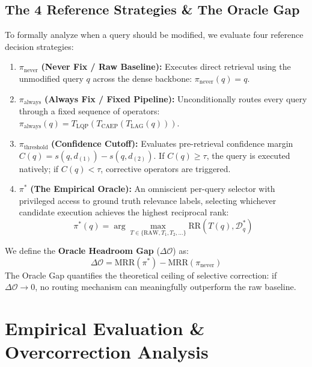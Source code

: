 \documentclass[conference]{IEEEtran}
\begin{document}
\subsection{The 4 Reference Strategies \& The Oracle Gap}
To formally analyze when a query should be modified, we evaluate four reference decision strategies:
\begin{enumerate}
    \item $\pi_{\text{never}}$ \textbf{(Never Fix / Raw Baseline):} Executes direct retrieval using the unmodified query $q$ across the dense backbone: $\pi_{\text{never}}(q) = q$.
    \item $\pi_{\text{always}}$ \textbf{(Always Fix / Fixed Pipeline):} Unconditionally routes every query through a fixed sequence of operators: $\pi_{\text{always}}(q) = T_{\text{LQP}}(T_{\text{CAEP}}(T_{\text{LAG}}(q)))$.
    \item $\pi_{\text{threshold}}$ \textbf{(Confidence Cutoff):} Evaluates pre-retrieval confidence margin $C(q) = s(q, d_{(1)}) - s(q, d_{(2)})$. If $C(q) \ge \tau$, the query is executed natively; if $C(q) < \tau$, corrective operators are triggered.
    \item $\pi^*$ \textbf{(The Empirical Oracle):} An omniscient per-query selector with privileged access to ground truth relevance labels, selecting whichever candidate execution achieves the highest reciprocal rank:
    \begin{equation}
    \pi^*(q) = \arg\max_{T \in \{\text{RAW}, T_1, T_2, \dots\}} \text{RR}(T(q), \mathcal{D}^*_q)
    \end{equation}
\end{enumerate}

We define the \textbf{Oracle Headroom Gap} ($\Delta\mathcal{O}$) as:
\begin{equation}
\Delta\mathcal{O} = \text{MRR}(\pi^*) - \text{MRR}(\pi_{\text{never}})
\end{equation}
The Oracle Gap quantifies the theoretical ceiling of selective correction: if $\Delta\mathcal{O} \to 0$, no routing mechanism can meaningfully outperform the raw baseline.

\section{Empirical Evaluation \& Overcorrection Analysis}
\label{sec:experiments}
\end{document}
